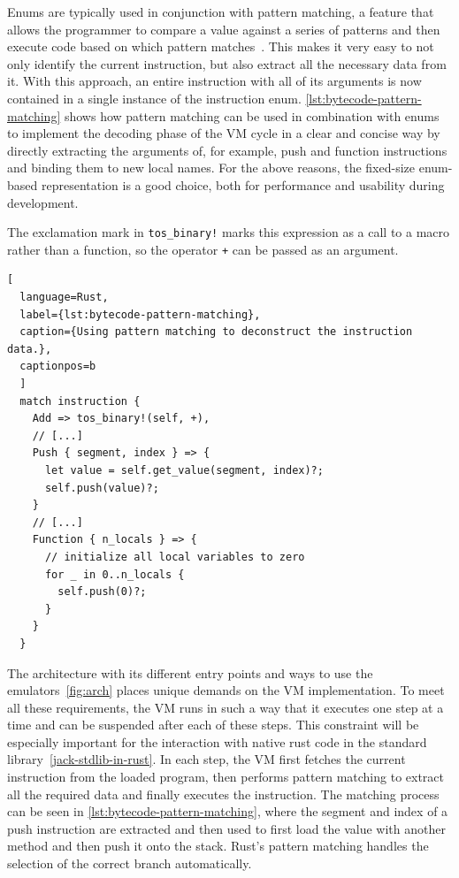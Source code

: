Enums are typically used in conjunction with pattern matching, a feature that allows the programmer to compare a value against a series of patterns and then execute code based on which pattern matches~\cite[Chapter~6.2]{klabnik2019rust}.
This makes it very easy to not only identify the current instruction, but also extract all the necessary data from it.
With this approach, an entire instruction with all of its arguments is now contained in a single instance of the instruction enum.
\cref{lst:bytecode-pattern-matching} shows how pattern matching can be used in combination with enums to implement the decoding phase of the VM cycle in a clear and concise way by directly extracting the arguments of, for example, push and function instructions and binding them to new local names.
For the above reasons, the fixed-size enum-based representation is a good choice, both for performance and usability during development.

The exclamation mark in \verb+tos_binary!+ marks this expression as a call to a macro rather than a function, so the operator \verb*=+= can be passed as an argument.
\begin{lstlisting}[
  language=Rust,
  label={lst:bytecode-pattern-matching},
  caption={Using pattern matching to deconstruct the instruction data.},
  captionpos=b
  ]
  match instruction {
    Add => tos_binary!(self, +),
    // [...]
    Push { segment, index } => {
      let value = self.get_value(segment, index)?;
      self.push(value)?;
    }
    // [...]
    Function { n_locals } => {
      // initialize all local variables to zero
      for _ in 0..n_locals {
        self.push(0)?;
      }
    }
  }
\end{lstlisting}

\label{step-by-step}
The architecture with its different entry points and ways to use the emulators~\ref{fig:arch} places unique demands on the VM implementation.
To meet all these requirements, the VM runs in such a way that it executes one step at a time and can be suspended after each of these steps.
This constraint will be especially important for the interaction with native rust code in the standard library~\ref{jack-stdlib-in-rust}.
In each step, the VM first fetches the current instruction from the loaded program, then performs pattern matching to extract all the required data and finally executes the instruction.
The matching process can be seen in \cref{lst:bytecode-pattern-matching}, where the segment and index of a push instruction are extracted and then used to first load the value with another method and then push it onto the stack.
Rust's pattern matching handles the selection of the correct branch automatically.

